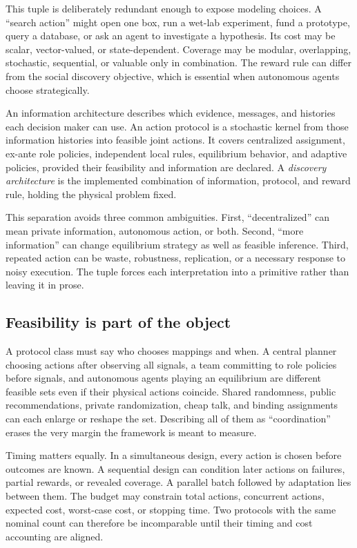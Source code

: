\documentclass[11pt]{article}
\theoremstyle{remark}
\begin{document}
This tuple is deliberately redundant enough to expose modeling choices. A ``search action'' might open one box, run a wet-lab experiment, fund a prototype, query a database, or ask an agent to investigate a hypothesis. Its cost may be scalar, vector-valued, or state-dependent. Coverage may be modular, overlapping, stochastic, sequential, or valuable only in combination. The reward rule can differ from the social discovery objective, which is essential when autonomous agents choose strategically.

An information architecture describes which evidence, messages, and histories each decision maker can use. An action protocol is a stochastic kernel from those information histories into feasible joint actions. It covers centralized assignment, ex-ante role policies, independent local rules, equilibrium behavior, and adaptive policies, provided their feasibility and information are declared. A \emph{discovery architecture} is the implemented combination of information, protocol, and reward rule, holding the physical problem fixed.

This separation avoids three common ambiguities. First, ``decentralized'' can mean private information, autonomous action, or both. Second, ``more information'' can change equilibrium strategy as well as feasible inference. Third, repeated action can be waste, robustness, replication, or a necessary response to noisy execution. The tuple forces each interpretation into a primitive rather than leaving it in prose.

\subsection*{Feasibility is part of the object}
A protocol class must say who chooses mappings and when. A central planner choosing actions after observing all signals, a team committing to role policies before signals, and autonomous agents playing an equilibrium are different feasible sets even if their physical actions coincide. Shared randomness, public recommendations, private randomization, cheap talk, and binding assignments can each enlarge or reshape the set. Describing all of them as ``coordination'' erases the very margin the framework is meant to measure.

Timing matters equally. In a simultaneous design, every action is chosen before outcomes are known. A sequential design can condition later actions on failures, partial rewards, or revealed coverage. A parallel batch followed by adaptation lies between them. The budget may constrain total actions, concurrent actions, expected cost, worst-case cost, or stopping time. Two protocols with the same nominal count can therefore be incomparable until their timing and cost accounting are aligned.
\end{document}
